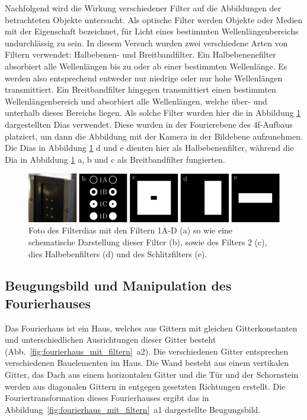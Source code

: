 Nachfolgend wird die Wirkung verschiedener Filter auf die Abbildungen der betrachteten Objekte untersucht. Als optische Filter werden Objekte oder Medien mit der Eigenschaft bezeichnet, für Licht eines bestimmten Wellenlängenbereichs undurchlässig zu sein. In diesem Versuch wurden zwei verschiedene Arten von Filtern verwendet: Halbebenen- und Breitbandfilter. Ein Halbebenenefilter absorbiert alle Wellenlängen bis zu oder ab einer bestimmten Wellenlänge. Es werden also entsprechend entweder nur niedrige oder nur hohe Wellenlängen transmittiert. Ein Breitbandfilter hingegen transmittiert einen bestimmten Wellenlängenbereich und absorbiert alle Wellenlängen, welche über- und unterhalb dieses Bereichs liegen. 
Als solche Filter wurden hier die in Abbildung \ref{fig:filter} dargestellten Dias verwendet. Diese wurden in der Fourierebene des 4f-Aufbaus platziert, um dann die Abbildung mit der Kamera in der Bildebene aufzunehmen. Die Dias in Abbildung \ref{fig:filter} d und e dienten hier als Halbebenenfilter, während die Dia in Abbildung \ref{fig:filter} a, b und c als Breitbandfilter fungierten. 


\begin{figure}[h]
	\centering
	\includegraphics{images/filter/abb.pdf}
	\caption[Verwendete Filter]{
		Foto des Filterdias mit den Filtern 1A-D (a) so wie eine schematische Darstellung dieser Filter (b), sowie des Filters 2 (c), dies Halbebenfilters (d) und des Schlitzfilters (e).
	}
	\label{fig:filter}
\end{figure}


\subsection{Beugungsbild und Manipulation des Fourierhauses}

Das Fourierhaus ist ein Haus, welches aus Gittern mit gleichen Gitterkonstanten und unterschiedlichen Ausrichtungen dieser Gitter besteht (Abb.~\ref{fig:fourierhaus_mit_filtern}~a2). Die verschiedenen Gitter entsprechen verschiedenen Bauelementen im Haus. Die Wand besteht aus einem vertikalen Gitter, das Dach aus einem horizontalen Gitter und die Tür und der Schornstein werden aus diagonalen Gittern in entgegen gesetzten Richtungen erstellt. Die Fouriertransformation dieses Fourierhauses ergibt das in Abbildung~\ref{fig:fourierhaus_mit_filtern}~a1 dargestellte Beugungsbild.

